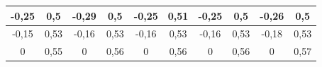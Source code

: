 \documentclass[a4paper, 12pt]{article}
\begin{document}
\begin{table}[H]
\begin{tabular}{|cc|cc|cc|cc|cc|}
	\multicolumn{1}{|c|}{-0,25}         & 0,5        & \multicolumn{1}{c|}{-0,29}         & 0,5        & \multicolumn{1}{c|}{-0,25}         & 0,51       & \multicolumn{1}{c|}{-0,25}         & 0,5        & \multicolumn{1}{c|}{-0,26}         & 0,5        \\ \hline
	\multicolumn{1}{|c|}{-0,15}         & 0,53       & \multicolumn{1}{c|}{-0,16}         & 0,53       & \multicolumn{1}{c|}{-0,16}         & 0,53       & \multicolumn{1}{c|}{-0,16}         & 0,53       & \multicolumn{1}{c|}{-0,18}         & 0,53       \\ \hline
	\multicolumn{1}{|c|}{0}             & 0,55       & \multicolumn{1}{c|}{0}             & 0,56       & \multicolumn{1}{c|}{0}             & 0,56       & \multicolumn{1}{c|}{0}             & 0,56       & \multicolumn{1}{c|}{0}             & 0,57       \\ \hline
	\end{tabular}
\end{table}
\end{document}
